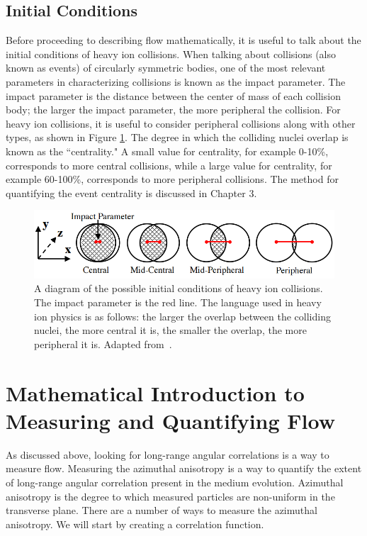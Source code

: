 \subsection{Initial Conditions}
\label{sec:initial_condition}
Before proceeding to describing flow mathematically, it is useful to talk about the initial conditions of heavy ion collisions. When talking about collisions (also known as events) of circularly symmetric bodies, one of the most relevant parameters in characterizing collisions is known as the impact parameter. The impact parameter is the distance between the center of mass of each collision body; the larger the impact parameter, the more peripheral the collision. For heavy ion collisions, it is useful to consider peripheral collisions along with other types, as shown in Figure \ref{fig:centrality_diagram}. The degree in which the colliding nuclei overlap is known as the ``centrality." A small value for centrality, for example 0-10\%, corresponds to more central collisions, while a large value for centrality, for example 60-100\%, corresponds to more peripheral collisions. The method for quantifying the event centrality is discussed in Chapter 3.
\begin{figure}[!ht]
\begin{center}
\includegraphics[width=0.65\linewidth]{figs/centrality_impact_parameter_diagram.PNG}
\caption{A diagram of the possible initial conditions of heavy ion collisions. The impact parameter is the red line. The language used in heavy ion physics is as follows: the larger the overlap between the colliding nuclei, the more central it is, the smaller the overlap, the more peripheral it is. Adapted from~\cite{Richardson:2012pka}.}
\label{fig:centrality_diagram}
\end{center}
\end{figure}


\section{Mathematical Introduction to Measuring and Quantifying Flow}
As discussed above, looking for long-range angular correlations is a way to measure flow. Measuring the azimuthal anisotropy is a way to quantify the extent of long-range angular correlation present in the medium evolution. Azimuthal anisotropy is the degree to which measured particles are non-uniform in the transverse plane. There are a number of ways to measure the azimuthal anisotropy. We will start by creating a correlation function. 

